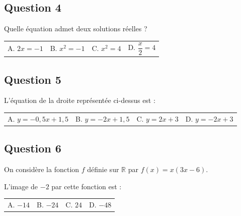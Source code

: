 \subsection*{Question 4}

Quelle équation admet deux solutions réelles ?
\begin{center}
\begin{tabularx}{.92\linewidth}{XXXX} A. $2x=-1$ & B. $x^2=-1$ & C. $x^2=4$ & D. $\dfrac{x}{2}=4$\end{tabularx}
\end{center}


\subsection*{Question 5}

\begin{center}
\end{center}

L'équation de la droite représentée ci-dessus est :
\begin{center}
\begin{tabularx}{.92\linewidth}{XXXX} A. $y=-0,5x+1,5$ & B. $y=-2x+1,5$ & C. $y=2x+3$ & D. $y=-2x+3$\end{tabularx}
\end{center}

\vspace{.8em}

\subsection*{Question 6}

On considère la fonction $f$ définie sur $\mathbb{R}$ par $f(x)=x(3x-6)$.\par
L'image de $-2$ par cette fonction est :
\begin{center}
\begin{tabularx}{.92\linewidth}{XXXX} A. $-14$ & B. $-24$ & C. $24$ & D. $-48$\end{tabularx}
\end{center}

